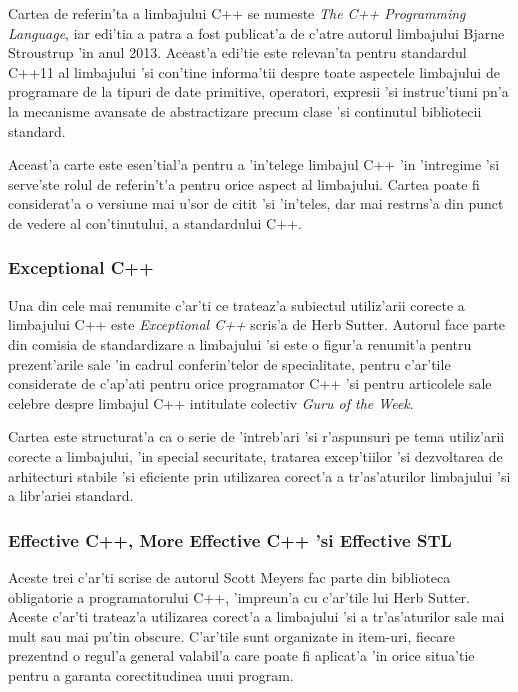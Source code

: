 Cartea de referin'ta a limbajului C++ se numeste \emph{The C++ Programming Language}, iar edi'tia a patra a fost publicat'a de c'atre autorul limbajului Bjarne Stroustrup 'in anul 2013. Aceast'a edi'tie este relevan'ta pentru standardul C++11 al limbajului 'si con'tine informa'tii despre toate aspectele limbajului de programare de la tipuri de date primitive, operatori, expresii 'si instruc'tiuni p{\ia}n'a la mecanisme avansate de abstractizare precum clase 'si continutul bibliotecii standard.

\medskip

Aceast'a carte este esen'tial'a pentru a 'in'telege limbajul C++ 'in 'intregime 'si serve'ste rolul de referin't'a pentru orice aspect al limbajului. Cartea poate fi considerat'a o versiune mai u'sor de citit 'si 'in'teles, dar mai restr{\ia}ns'a din punct de vedere al con'tinutului, a standardului C++.

\subsubsection{Exceptional C++}

Una din cele mai renumite c'ar'ti ce trateaz'a subiectul utiliz'arii corecte a limbajului C++ este \emph{Exceptional C++}\cite{exceptional_cpp} scris'a de Herb Sutter. Autorul face parte din comisia de standardizare a limbajului 'si este o figur'a renumit'a pentru prezent'arile sale 'in cadrul conferin'telor de specialitate, pentru c'ar'tile considerate de c'ap'at{\ia}i pentru orice programator C++ 'si pentru articolele sale celebre despre limbajul C++ intitulate colectiv \emph{Guru of the Week}.

\medskip

Cartea este structurat'a ca o serie de 'intreb'ari 'si r'aspunsuri pe tema utiliz'arii corecte a limbajului, 'in special securitate, tratarea excep'tiilor 'si dezvoltarea de arhitecturi stabile 'si eficiente prin utilizarea corect'a a tr'as'aturilor limbajului 'si a libr'ariei standard.

\subsubsection{Effective C++, More Effective C++ 'si Effective STL}

Aceste trei c'ar'ti\cite{effective_cpp}\cite{more_effective_cpp}\cite{effective_stl} scrise de autorul Scott Meyers fac parte din biblioteca obligatorie a programatorului C++, 'impreun'a cu c'ar'tile lui Herb Sutter. Aceste c'ar'ti trateaz'a utilizarea corect'a a limbajului 'si a tr'as'aturilor sale mai mult sau mai pu'tin obscure. C'ar'tile sunt organizate in item-uri, fiecare prezent{\ia}nd o regul'a general valabil'a care poate fi aplicat'a 'in orice situa'tie pentru a garanta corectitudinea unui program.

